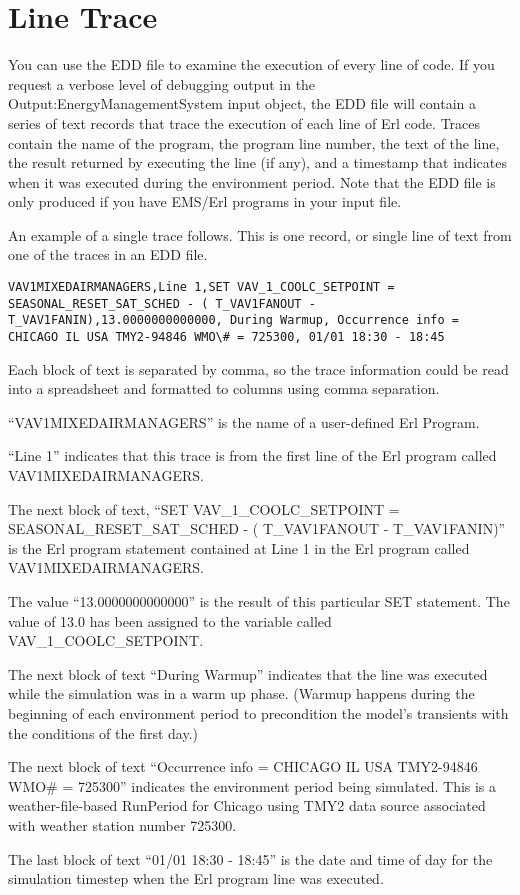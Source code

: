\section{Line Trace}\label{line-trace}

You can use the EDD file to examine the execution of every line of code. If you request a verbose level of debugging output in the Output:EnergyManagementSystem input object, the EDD file will contain a series of text records that trace the execution of each line of Erl code. Traces contain the name of the program, the program line number, the text of the line, the result returned by executing the line (if any), and a timestamp that indicates when it was executed during the environment period. Note that the EDD file is only produced if you have EMS/Erl programs in your input file.

An example of a single trace follows. This is one record, or single line of text from one of the traces in an EDD file.

\begin{lstlisting}
VAV1MIXEDAIRMANAGERS,Line 1,SET VAV_1_COOLC_SETPOINT = SEASONAL_RESET_SAT_SCHED - ( T_VAV1FANOUT - T_VAV1FANIN),13.0000000000000, During Warmup, Occurrence info = CHICAGO IL USA TMY2-94846 WMO\# = 725300, 01/01 18:30 - 18:45
\end{lstlisting}

Each block of text is separated by comma, so the trace information could be read into a spreadsheet and formatted to columns using comma separation.

``VAV1MIXEDAIRMANAGERS'' is the name of a user-defined Erl Program.

``Line 1'' indicates that this trace is from the first line of the Erl program called VAV1MIXEDAIRMANAGERS.

The next block of text, ``SET VAV\_1\_COOLC\_SETPOINT = SEASONAL\_RESET\_SAT\_SCHED - ( T\_VAV1FANOUT - T\_VAV1FANIN)'' is the Erl program statement contained at Line 1 in the Erl program called VAV1MIXEDAIRMANAGERS.

The value ``13.0000000000000'' is the result of this particular SET statement. The value of 13.0 has been assigned to the variable called VAV\_1\_COOLC\_SETPOINT.

The next block of text ``During Warmup'' indicates that the line was executed while the simulation was in a warm up phase. (Warmup happens during the beginning of each environment period to precondition the model's transients with the conditions of the first day.)

The next block of text ``Occurrence info = CHICAGO IL USA TMY2-94846 WMO\# = 725300'' indicates the environment period being simulated. This is a weather-file-based RunPeriod for Chicago using TMY2 data source associated with weather station number 725300.

The last block of text ``01/01 18:30 - 18:45'' is the date and time of day for the simulation timestep when the Erl program line was executed.
